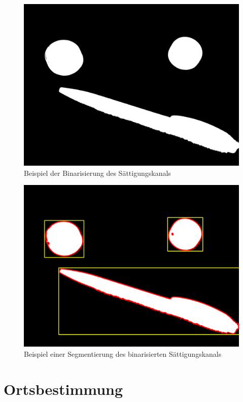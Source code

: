 \begin{figure}[h]
\centering
\includegraphics[width=\textwidth/2]{Bilder/Software/ColormodelsBinarized}
\caption{Beispiel der Binarisierung des Sättigungskanals}
\label{fig:BinarizedColorModels}
\end{figure}
\begin{figure}[h]
\centering
\includegraphics[width=\textwidth/2]{Bilder/Software/ColormodelsSegmentated}
\caption{Beispiel einer Segmentierung des binarisierten Sättigungskanals}
\label{fig:SegmentedColorModels}
\end{figure}

\section{Ortsbestimmung}

